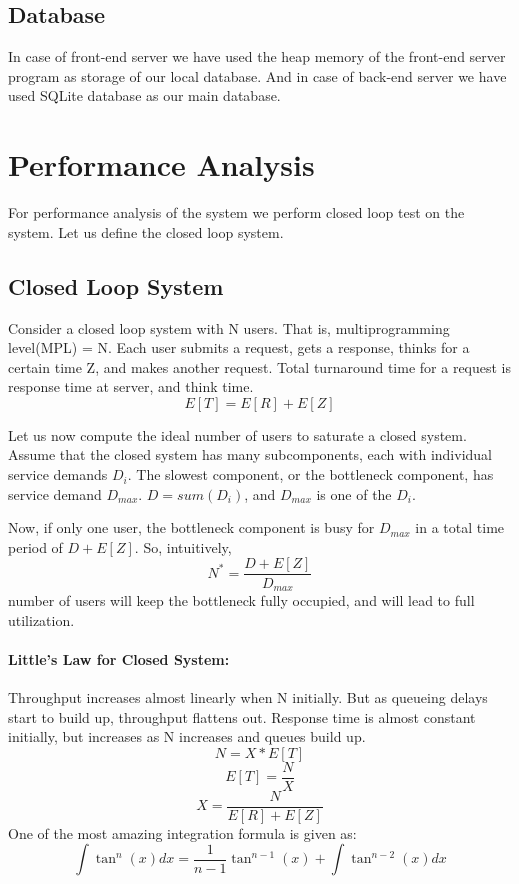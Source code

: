\documentclass[11pt]{article}
\begin{document}
		\subsection{Database}
			In case of front-end server we have used the heap memory of the front-end server program as storage of our local database. And in case of back-end server we have used SQLite database as our main database.
	\section{\label{section:performance}Performance Analysis}
		For performance analysis of the system we perform closed loop test on the system. Let us define the closed loop system.
		\subsection{Closed Loop System}
			Consider a closed loop system with N users. That is, multiprogramming level(MPL) = N. Each user submits a request, gets a response, thinks for a certain time Z, and makes another request. Total turnaround time for a request is response time at server, and think time. 
			$$E[T] = E[R] + E[Z]$$
			
			Let us now compute the ideal number of users to saturate a closed system. Assume that the closed system has many subcomponents, each with individual service demands $D_i$. The slowest component, or the bottleneck component, has service demand $D_{max}$. $D = sum(D_i)$, and $D_{max}$ is one of the $D_i$.
			
			Now, if only one user, the bottleneck component is busy for $D_{max}$ in a total time period of $D+E[Z]$. So, intuitively, $$N^* = \frac{D+E[Z]}{D_{max}}$$ number of users will keep the bottleneck fully occupied, and will lead to full utilization.
			
			\paragraph{Little's Law for Closed System:}
				Throughput increases almost linearly when N initially. But as queueing delays start to build up, throughput flattens out. Response time is almost constant initially, but increases as N increases and queues build up.
				$$N = X*E[T]$$  $$E[T] = \frac{N}{X}$$
				$$X = \frac{N}{E[R] + E[Z]}$$ 
				One of the most amazing integration formula is given as:
				$$ \int \tan^n(x)dx = \frac{1}{n-1}\tan^{n-1}(x)+\int \tan^{n-2}(x)dx  $$
				
\end{document}
